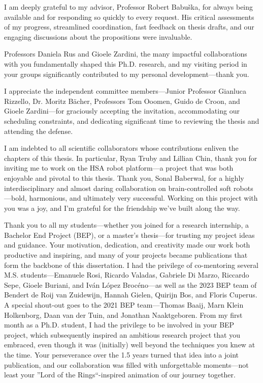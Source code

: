I am deeply grateful to my advisor, Professor Robert Babuška, for always being available and for responding so quickly to every request. His critical assessments of my progress, streamlined coordination, fast feedback on thesis drafts, and our engaging discussions about the propositions were invaluable.

Professors Daniela Rus and Gioele Zardini, the many impactful collaborations with you fundamentally shaped this Ph.D. research, and my visiting period in your groups significantly contributed to my personal development—thank you.

I appreciate the independent committee members—Junior Professor Gianluca Rizzello, Dr. Moritz Bächer, Professors Tom Ooomen, Guido de Croon, and Gioele Zardini—for graciously accepting the invitation, accommodating our scheduling constraints, and dedicating significant time to reviewing the thesis and attending the defense.

I am indebted to all scientific collaborators whose contributions enliven the chapters of this thesis. In particular, Ryan Truby and Lillian Chin, thank you for inviting me to work on the HSA robot platform—a project that was both enjoyable and pivotal to this thesis.
Thank you, Sonal Baberwal, for a highly interdisciplinary and almost daring collaboration on brain-controlled soft robots—bold, harmonious, and ultimately very successful. Working on this project with you was a joy, and I’m grateful for the friendship we’ve built along the way.

Thank you to all my students—whether you joined for a research internship, a Bachelor End Project (BEP), or a master’s thesis—for trusting my project ideas and guidance. Your motivation, dedication, and creativity made our work both productive and inspiring, and many of your projects became publications that form the backbone of this dissertation.
I had the privilege of co-mentoring several M.S. students—Emanuele Rosi, Ricardo Valadas, Gabriele Di Marzo, Riccardo Sepe, Gioele Buriani, and Iván López Brocéno—as well as the 2023 BEP team of Bendert de Roij van Zuidewijn, Hannah Gielen, Quirijn Bos, and Floris Cuperus.
A special shout-out goes to the 2021 BEP team—Thomas Baaij, Marn Klein Holkenborg, Daan van der Tuin, and Jonathan Naaktgeboren. From my first month as a Ph.D. student, I had the privilege to be involved in your BEP project, which subsequently inspired an ambitious research project that you embraced, even though it was (initially) well beyond the techniques you knew at the time. Your perseverance over the 1.5 years turned that idea into a joint publication, and our collaboration was filled with unforgettable moments—not least your ''Lord of the Rings``-inspired animation of our journey together.

